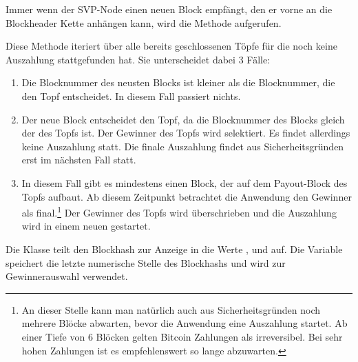 Immer wenn der SVP-Node einen neuen Block empfängt, den er vorne an die Blockheader Kette anhängen kann, wird die  Methode aufgerufen.


Diese Methode iteriert über alle bereits geschlossenen Töpfe für die noch keine Auszahlung stattgefunden hat. Sie unterscheidet dabei 3 Fälle:
\begin{enumerate}
\item Die Blocknummer des neusten Blocks ist kleiner als die Blocknummer, die den Topf entscheidet. In diesem Fall passiert nichts.
\item Der neue Block entscheidet den Topf, da die Blocknummer des Blocks gleich der  des Topfs ist. Der Gewinner des Topfs wird selektiert. Es findet allerdings keine Auszahlung statt. Die finale Auszahlung findet aus Sicherheitsgründen erst im nächsten Fall statt.
\item In diesem Fall gibt es mindestens einen Block, der auf dem Payout-Block des Topfs aufbaut. Ab diesem Zeitpunkt betrachtet die Anwendung den Gewinner als final.\footnote{An dieser Stelle kann man natürlich auch aus Sicherheitsgründen noch mehrere Blöcke abwarten, bevor die Anwendung eine Auszahlung startet. Ab einer Tiefe von 6 Blöcken gelten Bitcoin Zahlungen als irreversibel. Bei sehr hohen Zahlungen ist es empfehlenswert so lange abzuwarten.} Der Gewinner des Topfs wird überschrieben und die Auszahlung wird in einem neuen  gestartet.
\end{enumerate}

Die Klasse  teilt den Blockhash zur Anzeige in die Werte ,  und  auf. Die Variable  speichert die letzte numerische Stelle des Blockhashs und wird zur Gewinnerauswahl verwendet.


\newpage

